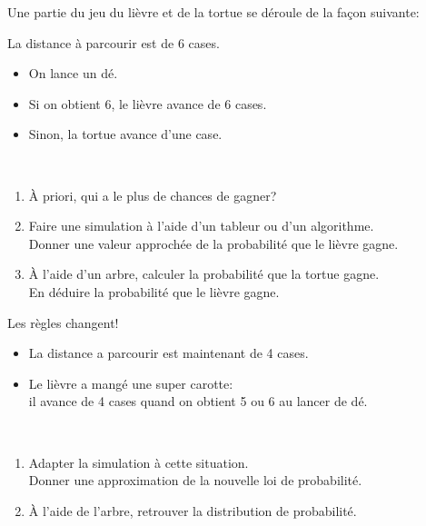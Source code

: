 \begin{TP} 

Une partie du jeu du lièvre et de la tortue se déroule de la façon suivante:\\
\parbox{0.8\linewidth}{
\begin{cadre}[H1][H4]
La distance à parcourir est de 6 cases.
\begin{itemize}
\item On lance un dé.
\item Si on obtient 6, le lièvre avance de 6 cases.
\item Sinon, la tortue avance d'une case.
\end{itemize}
\end{cadre}}\\
\begin{enumerate}
\item \`A priori, qui a le plus de chances de gagner?
\item Faire une simulation à l'aide d'un tableur ou d'un algorithme.\\
Donner une valeur approchée de la probabilité que le lièvre gagne.
\item \`A l'aide d'un arbre, calculer la probabilité que la tortue gagne. \\
En déduire la probabilité que le lièvre gagne.
\end{enumerate}

Les règles changent!\\
\parbox{0.8\linewidth}{
\begin{cadre}[J1][J4]

\begin{itemize}
\item La distance a parcourir est maintenant de 4 cases.
\item Le lièvre a mangé une super carotte:\\ il avance de 4 cases quand on obtient 5 ou 6 au lancer de dé.
\end{itemize}
\end{cadre}}\\
\vspace{-1.5em}

\begin{enumerate}
\item Adapter la simulation à cette situation.\\Donner une approximation de la nouvelle loi de probabilité.
\item \`A l'aide de l'arbre, retrouver la distribution de probabilité.
\end{enumerate}
\end{TP}

